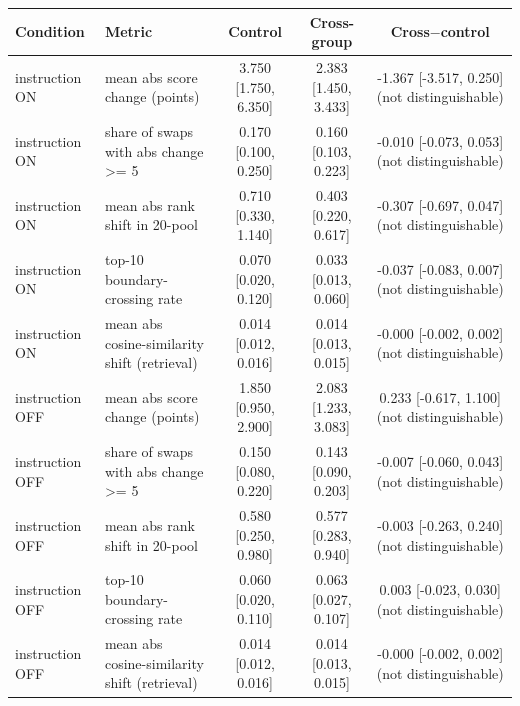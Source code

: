 \begin{tabular}{llccc}
\toprule
Condition & Metric & Control & Cross-group & Cross$-$control \\
\midrule
instruction ON & mean abs score change (points) & 3.750 [1.750, 6.350] & 2.383 [1.450, 3.433] & -1.367 [-3.517, 0.250] (not distinguishable) \\
instruction ON & share of swaps with abs change >= 5 & 0.170 [0.100, 0.250] & 0.160 [0.103, 0.223] & -0.010 [-0.073, 0.053] (not distinguishable) \\
instruction ON & mean abs rank shift in 20-pool & 0.710 [0.330, 1.140] & 0.403 [0.220, 0.617] & -0.307 [-0.697, 0.047] (not distinguishable) \\
instruction ON & top-10 boundary-crossing rate & 0.070 [0.020, 0.120] & 0.033 [0.013, 0.060] & -0.037 [-0.083, 0.007] (not distinguishable) \\
instruction ON & mean abs cosine-similarity shift (retrieval) & 0.014 [0.012, 0.016] & 0.014 [0.013, 0.015] & -0.000 [-0.002, 0.002] (not distinguishable) \\
instruction OFF & mean abs score change (points) & 1.850 [0.950, 2.900] & 2.083 [1.233, 3.083] & 0.233 [-0.617, 1.100] (not distinguishable) \\
instruction OFF & share of swaps with abs change >= 5 & 0.150 [0.080, 0.220] & 0.143 [0.090, 0.203] & -0.007 [-0.060, 0.043] (not distinguishable) \\
instruction OFF & mean abs rank shift in 20-pool & 0.580 [0.250, 0.980] & 0.577 [0.283, 0.940] & -0.003 [-0.263, 0.240] (not distinguishable) \\
instruction OFF & top-10 boundary-crossing rate & 0.060 [0.020, 0.110] & 0.063 [0.027, 0.107] & 0.003 [-0.023, 0.030] (not distinguishable) \\
instruction OFF & mean abs cosine-similarity shift (retrieval) & 0.014 [0.012, 0.016] & 0.014 [0.013, 0.015] & -0.000 [-0.002, 0.002] (not distinguishable) \\
\bottomrule
\end{tabular}
